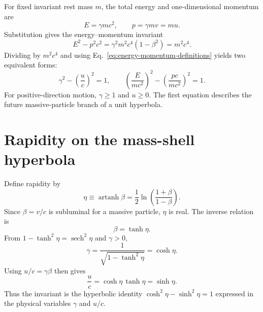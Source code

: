 \documentclass[12pt]{article}
\begin{document}
For fixed invariant rest mass $m$, the total energy and one-dimensional momentum are
\begin{equation}
  E=\gamma mc^2,
  \qquad
  p=\gamma mv=mu.
  \label{eq:energy-momentum-definitions}
\end{equation}
Substitution gives the energy--momentum invariant
\begin{equation}
  E^2-p^2c^2
  =\gamma^2m^2c^4\left(1-\beta^2\right)
  =m^2c^4.
  \label{eq:mass-shell}
\end{equation}
Dividing by $m^2c^4$ and using Eq.~\eqref{eq:energy-momentum-definitions} yields two equivalent forms:
\begin{equation}
  \gamma^2-\left(\frac{u}{c}\right)^2=1,
  \qquad
  \left(\frac{E}{mc^2}\right)^2-
  \left(\frac{pc}{mc^2}\right)^2=1.
  \label{eq:dimensionless-mass-shell}
\end{equation}
For positive-direction motion, $\gamma\geq 1$ and $u\geq0$. The first equation describes the future massive-particle branch of a unit hyperbola.

\section{Rapidity on the mass-shell hyperbola}
\label{sec:rapidity}

Define rapidity by
\begin{equation}
  \eta\equiv\operatorname{artanh}\beta
  =\frac{1}{2}\ln\!\left(\frac{1+\beta}{1-\beta}\right).
  \label{eq:rapidity-definition}
\end{equation}
Since $\beta=v/c$ is subluminal for a massive particle, $\eta$ is real. The inverse relation is
\begin{equation}
  \beta=\tanh\eta.
  \label{eq:beta-tanh}
\end{equation}
From $1-\tanh^2\eta=\operatorname{sech}^2\eta$ and $\gamma>0$,
\begin{equation}
  \gamma=\frac{1}{\sqrt{1-\tanh^2\eta}}=\cosh\eta.
  \label{eq:gamma-cosh}
\end{equation}
Using $u/c=\gamma\beta$ then gives
\begin{equation}
  \frac{u}{c}=\cosh\eta\,\tanh\eta=\sinh\eta.
  \label{eq:u-sinh}
\end{equation}
Thus the invariant is the hyperbolic identity $\cosh^2\eta-\sinh^2\eta=1$ expressed in the physical variables $\gamma$ and $u/c$.
\end{document}
